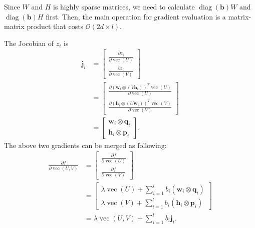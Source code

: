 \documentclass[11pt,twoside]{article}
\newcommand{\bsym}[1]{\ensuremath{\boldsymbol{#1}}}
\newcommand{\bw}{\ensuremath{\bsym{w}}}
\newcommand{\bj}{\ensuremath{\bsym{j}}}
\newcommand{\bp}{\ensuremath{\bsym{p}}}
\newcommand{\bq}{\ensuremath{\bsym{q}}}
\newcommand{\bh}{\ensuremath{\bsym{h}}}
\newcommand{\bbO}[1]{\ensuremath{\mathcal{O}\left(#1\right)}}
\DeclareMathOperator*{\diag}{diag}
\DeclareMathOperator*{\vectorize}{vec}
\begin{document}
Since $W$ and $H$ is highly sparse matrices, we need to calculate $\diag(\bsym{b})W$ and $\diag(\bsym{b})H$ first.
Then, the main operation for gradient evaluation is a matrix-matrix product that costs $\bbO{2d\times l}$.
\par

The Jocobian of $z_i$ is
\begin {align}
\bj_i &= \begin{bmatrix} \frac{\partial z_i}{\partial \vectorize(U)} \\ \frac{\partial z_i}{\partial \vectorize(V)} \end{bmatrix}\nonumber \\
&= \begin{bmatrix} \frac{\partial (\bw_i \otimes (V \bh_i))^T\vectorize(U)}{\partial \vectorize(U)} \\ \frac{\partial (\bh_i \otimes (U \bw_i))^T\vectorize(V)}{\partial \vectorize(V)} \end{bmatrix}\nonumber \\
&= \begin{bmatrix} \bw_i\otimes \bq_i \\ \bh_i\otimes \bp_i \end{bmatrix}
\label{eq:Jacob}.
\end{align}
The above two gradients can be merged as following:
\begin{align}
\frac{\partial f}{\partial \vectorize(U,V)} 
&=\begin{bmatrix} \frac{\partial f}{\partial \vectorize(U)} \\ \frac{\partial f}{\partial \vectorize(V)} \end{bmatrix}\nonumber\\
&=\begin{bmatrix} \lambda \vectorize(U) +  \sum_{i=1}^l b_i (\bw_i\otimes\bq_i) \\ \lambda \vectorize(V) +  \sum_{i=1}^l b_i (\bh_i\otimes\bp_i)\end{bmatrix}\nonumber\\
&=\lambda \vectorize(U,V) + \sum_{i=1}^l b_i \bj_i
\label{eq:GradUV}.
\end{align}
\end{document}
